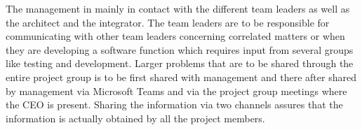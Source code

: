 \documentclass[12pt]{article}
\begin{document}
The management in mainly in contact with the different team leaders as well as the architect and the integrator. The team leaders are to be responsible for communicating with other team leaders concerning correlated matters or when they are developing a software function which requires input from several groups like testing and development. Larger problems that are to be shared through the entire project group is to be first shared with management and there after shared by management via Microsoft Teams and via the project group meetings where the CEO is present. Sharing the information via two channels assures that the information is actually obtained by all the project members. 
\end{document}
